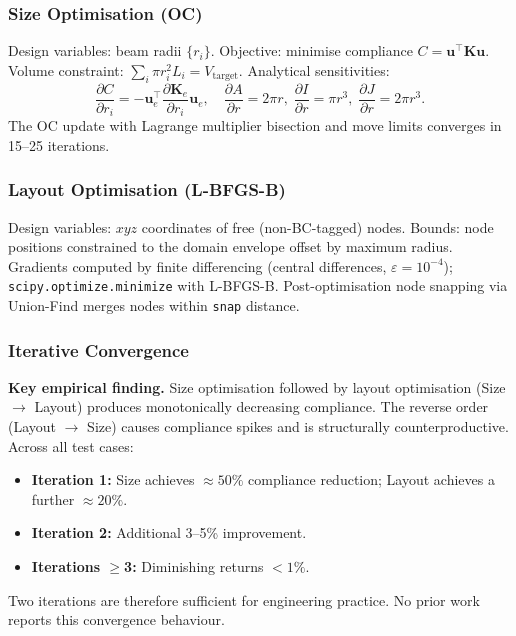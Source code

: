 \documentclass[11pt,a4paper]{article}
\begin{document}
\subsubsection{Size Optimisation (OC)}

Design variables: beam radii $\{r_i\}$.
Objective: minimise compliance $C = \mathbf{u}^{\top}\mathbf{K}\mathbf{u}$.
Volume constraint: $\sum_i \pi r_i^2 L_i = V_{\text{target}}$.
Analytical sensitivities:
\begin{equation}
    \frac{\partial C}{\partial r_i}
      = -\mathbf{u}_e^{\top}\frac{\partial \mathbf{K}_e}{\partial r_i}\mathbf{u}_e,
    \quad
    \frac{\partial A}{\partial r} = 2\pi r,\;
    \frac{\partial I}{\partial r} = \pi r^3,\;
    \frac{\partial J}{\partial r} = 2\pi r^3.
\end{equation}
The OC update with Lagrange multiplier bisection and move limits converges in
15--25 iterations.

\subsubsection{Layout Optimisation (L-BFGS-B)}

Design variables: $xyz$ coordinates of free (non-BC-tagged) nodes.
Bounds: node positions constrained to the domain envelope offset by maximum
radius.
Gradients computed by finite differencing (central differences, $\varepsilon =
10^{-4}$); \texttt{scipy.optimize.minimize} with L-BFGS-B.
Post-optimisation node snapping via Union-Find merges nodes within
\texttt{snap} distance.

\subsubsection{Iterative Convergence}
\label{subsubsec:convergence}

\textbf{Key empirical finding.}
Size optimisation followed by layout optimisation (Size $\to$ Layout) produces
monotonically decreasing compliance.
The reverse order (Layout $\to$ Size) causes compliance spikes and is
structurally counterproductive.
Across all test cases:
\begin{itemize}
    \item \textbf{Iteration 1:} Size achieves $\approx50\%$ compliance
          reduction; Layout achieves a further $\approx20\%$.
    \item \textbf{Iteration 2:} Additional 3--5\% improvement.
    \item \textbf{Iterations $\geq$3:} Diminishing returns $<1\%$.
\end{itemize}
Two iterations are therefore sufficient for engineering practice.
No prior work \cite{yin2020,polak2023} reports this convergence behaviour.
\end{document}
